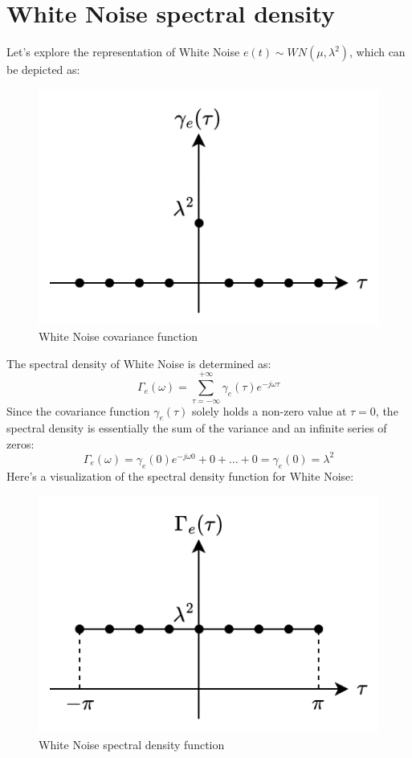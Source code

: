 \section{White Noise spectral density}

Let's explore the representation of White Noise $e(t) \sim WN (\mu,\lambda^2)$, which can be depicted as:
\begin{figure}[H]
    \centering
    \includegraphics[width=0.35\linewidth]{images/wn1.png}
    \caption{White Noise covariance function}
\end{figure}

The spectral density of White Noise is determined as:
\[\Gamma_e(\omega)=\sum_{\tau=-\infty}^{+\infty}\gamma_e(\tau)e^{-j\omega\tau}\]
Since the covariance function $\gamma_e(\tau)$ solely holds a non-zero value at $\tau=0$, the spectral density is essentially the sum of the variance and an infinite series of zeros:
\[\Gamma_e(\omega)=\gamma_e(0)e^{-j\omega 0}+0+\dots+0=\gamma_e(0)=\lambda^2\]
Here's a visualization of the spectral density function for White Noise:
\begin{figure}[H]
    \centering
    \includegraphics[width=0.35\linewidth]{images/wn2.png}
    \caption{White Noise spectral density function}
\end{figure}